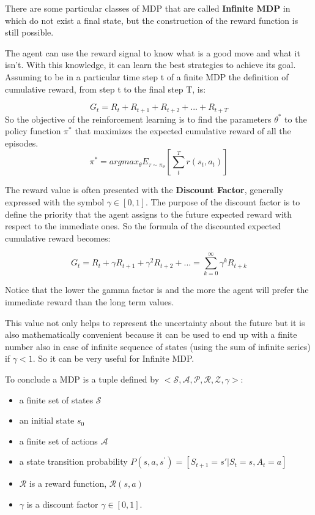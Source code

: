 There are some particular classes of MDP that are called \textbf{Infinite MDP} in which do not exist a final state, but the construction of the reward function is still possible.

The agent can use the reward signal to know what is a good move and what it isn't.
With this knowledge, it can learn the best strategies to achieve its goal.
Assuming to be in a particular time step t of a finite MDP the definition of cumulative reward, from step t to the final step T, is:

\begin{equation*}
G_t = R_{t} + R_{t+1} + R_{t+2} + ... + R_{t+T}  
\end{equation*}
So the objective of the reinforcement learning is to find the parameters $\theta^*$  to the policy function $\pi^*$ that maximizes the expected cumulative reward of all the episodes.
\begin{equation*}
\label{policy_function}
    \pi^* = argmax_\theta E_{\tau \sim \pi_\theta} \left [\sum_{t}^{T}    r(s_t, a_t)  \right ]
\end{equation*}

The reward value is often presented with the \textbf{Discount Factor}, generally expressed with the symbol $\gamma \in [0,1]$. 
The purpose of the discount factor is to define the priority that the agent assigns to the future expected reward with respect to the immediate ones.
So the formula of the discounted expected cumulative reward becomes:

\begin{equation*}
G_t = R_{t} + \gamma R_{t+1} + \gamma^2 R_{t+2} + ... = \sum_{k=0}^\infty \gamma^k R_{t+k} 
\end{equation*}


Notice that the lower the gamma factor is and the more the agent will prefer the immediate reward than the long term values. 

This value not only helps to represent the uncertainty about the future but it is also mathematically convenient because it can be used to end up with a finite number also in case of infinite sequence of states (using the sum of infinite series) if $\gamma < 1$. 
So it can be very useful for Infinite MDP. 





To conclude a MDP is a tuple defined by $<\mathcal{S},\mathcal{A},\mathcal{P},\mathcal{R}, \mathcal{Z}, \gamma>$:
\begin{itemize}
  \item a finite set of states $\mathcal{S}$ 
  \item an initial state $s_0$
  \item a finite set of actions $\mathcal{A}$
  \item a state transition probability $P(s, a, s^{'}) = [S_{t+1} = s' | S_t = s, A_t = a] $
  \item $\mathcal{R}$ is a reward function, $\mathcal{R}(s,a)$ 
  \item $\gamma$ is a discount factor $ \gamma \in [0,1].$
\end{itemize}



